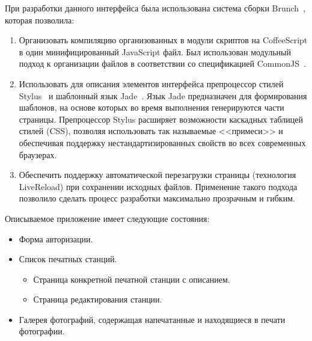 \documentclass[a4paper,14pt,href,draft]{article}
\begin{document}
При разработки данного интерфейса была использована система сборки Brunch~\cite{Brunch}, которая позволила:

\begin{enumerate}
  \item Организовать компиляцию организованных в модули скриптов на CoffeeScript в один минифицированный JavaScript файл.
    Был использован модульный подход к организации файлов в соответствии со спецификацией CommonJS~\cite{CommonJS}.

  \item Использовать для описания элементов интерфейса препроцессор стилей Stylus~\cite{Stylus} и шаблонный язык
  Jade~\cite{JadeLang}. Язык Jade предназначен для формирования шаблонов, на основе которых во время выполнения
  генерируются части страницы. Препроцессор Stylus расширяет возможности каскадных таблицей стилей (CSS), позволяя
  использовать так называемые <<примеси>> и обеспечивая поддержку нестандартизированных свойств во всех современных
  браузерах.

  \item Обеспечить поддержку автоматической перезагрузки страницы (технология LiveReload) при сохранении исходных файлов.
  Применение такого подхода позволило сделать процесс разработки максимально прозрачным и гибким.
\end{enumerate}

Описываемое приложение имеет следующие состояния:
\begin{itemize}
  \item Форма авторизации.

  \item Список печатных станций.
     \begin{itemize}
        \item Страница конкретной печатной станции с описанием.
        \item Страница редактирования станции.
     \end{itemize}

  \item Галерея фотографий, содержащая напечатанные и находящиеся в печати фотографии.
\end{itemize}
\end{document}
